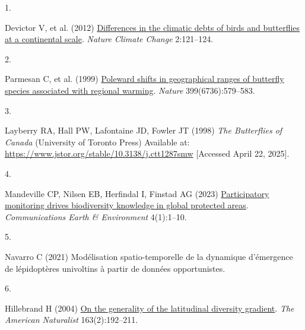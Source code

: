 \documentclass[9pt,twocolumn,twoside,]{pnas-new}
\newlength{\cslhangindent}
\newlength{\csllabelwidth}
\newenvironment{CSLReferences}[2] %
 {\begin{list}{}{%
  \setlength{\itemindent}{0pt}
  \setlength{\leftmargin}{0pt}
  \setlength{\parsep}{0pt}
  \ifodd #1
   \setlength{\leftmargin}{\cslhangindent}
   \setlength{\itemindent}{-1\cslhangindent}
  \fi
  \setlength{\itemsep}{#2\baselineskip}}}
 {\end{list}}
\newcommand{\CSLLeftMargin}[1]{\parbox[t]{\csllabelwidth}{#1}}
\newcommand{\CSLRightInline}[1]{\parbox[t]{\linewidth - \csllabelwidth}{#1}\break}
\begin{document}
\label{refs}
\begin{CSLReferences}{0}{1}
\CSLLeftMargin{1. }%
\CSLRightInline{Devictor V, et al. (2012)
\href{https://doi.org/10.1038/NCLIMATE1347}{Differences in the climatic
debts of birds and butterflies at a continental scale}. \emph{Nature
Climate Change} 2:121--124.}

\CSLLeftMargin{2. }%
\CSLRightInline{Parmesan C, et al. (1999)
\href{https://doi.org/10.1038/21181}{Poleward shifts in geographical
ranges of butterfly species associated with regional warming}.
\emph{Nature} 399(6736):579--583.}

\CSLLeftMargin{3. }%
\CSLRightInline{Layberry RA, Hall PW, Lafontaine JD, Fowler JT (1998)
\emph{The {Butterflies} of {Canada}} (University of Toronto Press)
Available at: \url{https://www.jstor.org/stable/10.3138/j.ctt1287smw}
{[}Accessed April 22, 2025{]}.}

\CSLLeftMargin{4. }%
\CSLRightInline{Mandeville CP, Nilsen EB, Herfindal I, Finstad AG (2023)
\href{https://doi.org/10.1038/s43247-023-00906-2}{Participatory
monitoring drives biodiversity knowledge in global protected areas}.
\emph{Communications Earth \& Environment} 4(1):1--10.}

\CSLLeftMargin{5. }%
\CSLRightInline{Navarro C (2021) Modélisation spatio-temporelle de la
dynamique d'émergence de lépidoptères univoltins à partir de données
opportunistes.}

\CSLLeftMargin{6. }%
\CSLRightInline{Hillebrand H (2004)
\href{https://doi.org/10.1086/381004}{On the generality of the
latitudinal diversity gradient}. \emph{The American Naturalist}
163(2):192--211.}

\end{CSLReferences}



% 
\end{document}

